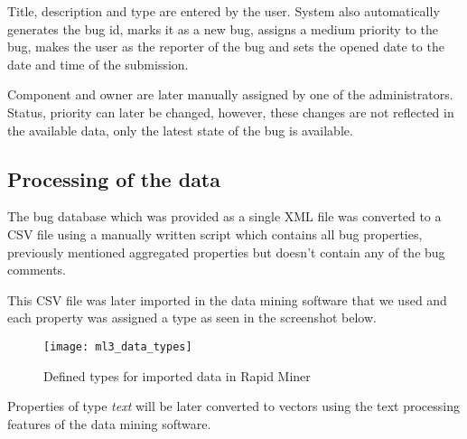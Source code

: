Title, description and type are entered by the user. System also automatically generates the bug id, marks it as a new bug, assigns a medium priority to the bug, makes the user as the reporter of the bug and sets the opened date to the date and time of the submission.

Component and owner are later manually assigned by one of the administrators. Status, priority can later be changed, however, these changes are not reflected in the available data, only the latest state of the bug is available.

\subsection*{Processing of the data} %

The bug database which was provided as a single XML file was converted to a CSV file using a manually written script which contains all bug properties, previously mentioned aggregated properties but doesn't contain any of the bug comments.

This CSV file was later imported in the data mining software that we used and each property was assigned a type as seen in the screenshot below.

\begin{figure}
\begin{center}
\texttt{[image: ml3\_data\_types]}
\caption{Defined types for imported data in Rapid Miner}
\end{center}
\end{figure}

Properties of type {\it text} will be later converted to vectors using the text processing features of the data mining software.

